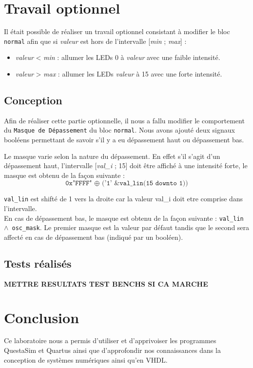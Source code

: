 \newpage

\section{Travail optionnel}

Il était possible de réaliser un travail optionnel consistant à modifier le bloc \texttt{normal} afin que si \textit{valeur} est hors de l'intervalle [\textit{min} ; \textit{max}] :

\begin{itemize}

\item \textit{valeur} < \textit{min} : allumer les LEDs 0 à \textit{valeur} avec une faible intensité.
\item \textit{valeur} > \textit{max} : allumer les LEDs \textit{valeur} à 15 avec une forte intensité.

\end{itemize}

\subsection{Conception}

Afin de réaliser cette partie optionnelle, il nous a fallu modifier le comportement du \texttt{Masque de Dépassement} du bloc \texttt{normal}. Nous avons ajouté deux signaux booléens permettant de savoir s'il y a eu dépassement haut ou dépassement bas.

Le masque varie selon la nature du dépassement. En effet s'il s'agit d'un dépassement haut, l'intervalle [\textit{val\_i} ; 15] doit être affiché à une intensité forte, le masque est obtenu de la façon suivante :
\begin{equation*}
 \texttt{0x"FFFF" $\oplus$ ('1' \& val\_lin(15 downto 1))} 
\end{equation*}

 \texttt{val\_lin} est shifté de 1 vers la droite car la valeur val\_i doit etre comprise dans l'intervalle. \\
 En cas de dépassement bas, le masque est obtenu de la façon suivante : \texttt{val\_lin $\land$ osc\_mask}. Le premier masque est la valeur par défaut tandis que le second sera affecté en cas de dépassement bas (indiqué par un booléen).
 
\subsection{Tests réalisés}

\textbf{METTRE RESULTATS TEST BENCHS SI CA MARCHE}

\section{Conclusion}

Ce laboratoire nous a permis d'utiliser et d'apprivoiser les programmes QuestaSim et Quartus ainsi que d'approfondir nos connaissances dans la conception de systèmes numériques ainsi qu'en VHDL.


